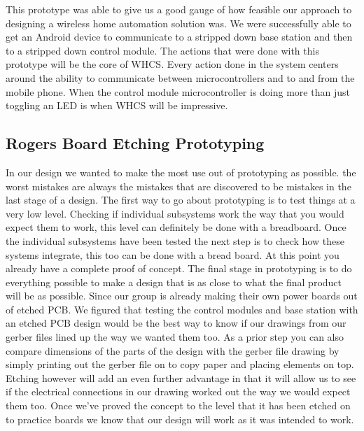 This prototype was able to give us a good gauge of how feasible
our approach to designing a wireless home automation solution was. We were 
successfully able to get an Android device to communicate to a stripped down
base station and then to a stripped down control module. The actions that were
done with this prototype will be the core of WHCS. Every action done in the
system centers around the ability to communicate between microcontrollers and
to and from the mobile phone.  When the control module microcontroller is doing
more than just toggling an LED is when WHCS will be impressive.

\subsection{Rogers Board Etching Prototyping}
In our design we wanted to make the most use out of prototyping as possible.
the worst mistakes are always the mistakes that are discovered to be mistakes
in the last stage of a design. The first way to go about prototyping is to test
things at a very low level. Checking if individual subsystems work the way that
you would expect them to work, this level can definitely be done with a
breadboard. Once the individual subsystems have been tested the next step is to
check how these systems integrate, this too can be done with a bread board. At
this point you already have a complete proof of concept. The final stage in
prototyping is to do everything possible to make a design that is as close to
what the final product will be as possible. Since our group is already making
their own power boards out of etched PCB. We figured that testing the control
modules and base station with an etched PCB design would be the best way to
know if our drawings from our gerber files lined up the way we wanted them too.
As a prior step you can also compare dimensions of the parts of the design with
the gerber file drawing by simply printing out the gerber file on to copy paper
and placing elements on top. Etching however will add an even further advantage
in that it will allow us to see if the electrical connections in our drawing
worked out the way we would expect them too. Once we{}'ve proved the concept to
the level that it has been etched on to practice boards we know that our design
will work as it was intended to work.

